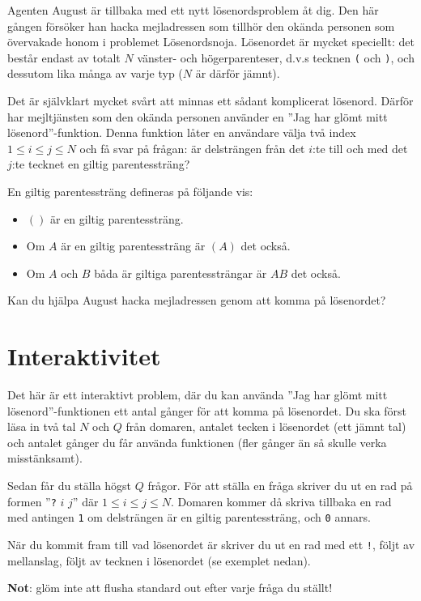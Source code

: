 Agenten August är tillbaka med ett nytt lösenordsproblem åt dig.
Den här gången försöker han hacka mejladressen som tillhör den okända personen som övervakade honom i problemet Lösenordsnoja.
Lösenordet är mycket speciellt: det består endast av totalt $N$ vänster- och högerparenteser, d.v.s tecknen \texttt{(} och \texttt{)}, och dessutom lika många av varje typ ($N$ är därför jämnt).

Det är självklart mycket svårt att minnas ett sådant komplicerat lösenord.
Därför har mejltjänsten som den okända personen använder en ''Jag har glömt mitt lösenord''-funktion.
Denna funktion låter en användare välja två index $1 \le i \le j \le N$ och få svar på frågan: är delsträngen från det $i$:te till och med det $j$:te tecknet en giltig parentessträng?

En giltig parentessträng defineras på följande vis:
\begin{itemize}
    \item $()$ är en giltig parentessträng.
    \item Om $A$ är en giltig parentessträng är $(A)$ det också.
    \item Om $A$ och $B$ båda är giltiga parentessträngar är $AB$ det också.
\end{itemize}

Kan du hjälpa August hacka mejladressen genom att komma på lösenordet?

\section*{Interaktivitet}
Det här är ett interaktivt problem, där du kan använda ''Jag har glömt mitt lösenord''-funktionen ett antal gånger för att komma på lösenordet.
Du ska först läsa in två tal $N$ och $Q$ från domaren, antalet tecken i lösenordet (ett jämnt tal) och antalet gånger du får använda funktionen (fler gånger än så skulle verka misstänksamt).

Sedan får du ställa högst $Q$ frågor.
För att ställa en fråga skriver du ut en rad på formen ''\texttt{?} $i$ $j$'' där $1 \le i \le j \le N$.
Domaren kommer då skriva tillbaka en rad med antingen \texttt{1} om delsträngen är en giltig parentessträng, och \texttt{0} annars.

När du kommit fram till vad lösenordet är skriver du ut en rad med ett \texttt{!}, följt av mellanslag, följt av tecknen i lösenordet (se exemplet nedan).

\textbf{Not}: glöm inte att flusha standard out efter varje fråga du ställt!

